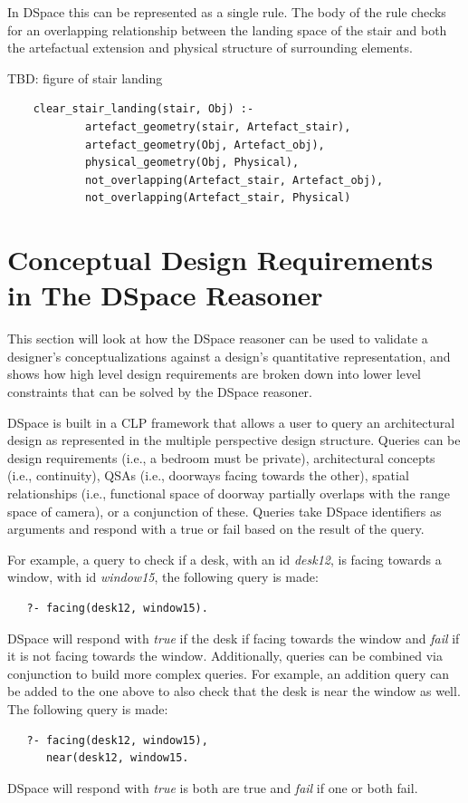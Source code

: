 \documentclass[12pt]{ucthesis}
\begin{document}
In DSpace this can be represented as a single rule. The body of the rule checks for an overlapping relationship between the landing space of the stair and both the artefactual extension and physical structure of surrounding elements.

TBD: figure of stair landing

\begin{verbatim}
    clear_stair_landing(stair, Obj) :- 
            artefact_geometry(stair, Artefact_stair),
            artefact_geometry(Obj, Artefact_obj),
            physical_geometry(Obj, Physical),
            not_overlapping(Artefact_stair, Artefact_obj),
            not_overlapping(Artefact_stair, Physical)
\end{verbatim}  

\section{Conceptual Design Requirements in The DSpace Reasoner}
This section will look at how the DSpace reasoner can be used to validate a designer's conceptualizations against a design's quantitative representation, and shows how high level design requirements are broken down into lower level constraints that can be solved by the DSpace reasoner.

DSpace is built in a CLP framework that allows a user to query an architectural design as represented in the multiple perspective design structure. Queries can be design requirements (i.e., a bedroom must be private), architectural concepts (i.e., continuity), QSAs (i.e., doorways facing towards the other), spatial relationships (i.e., functional space of doorway partially overlaps with the range space of camera), or a conjunction of these. Queries take DSpace identifiers as arguments and respond with a true or fail based on the result of the query. 

For example, a query to check if a desk, with an id \emph{desk12}, is facing towards a window, with id \emph{window15}, the following query is made:
\begin{verbatim}
   ?- facing(desk12, window15).
\end{verbatim} 
DSpace will respond with \emph{true} if the desk if facing towards the window and \emph{fail} if it is not facing towards the window. Additionally, queries can be combined via conjunction to build more complex queries. For example, an addition query can be added to the one above to also check that the desk is near the window as well. The following query is made:
\begin{verbatim}
   ?- facing(desk12, window15),
      near(desk12, window15.
\end{verbatim}
DSpace will respond with \emph{true} is both are true and \emph{fail} if one or both fail.
\end{document}
